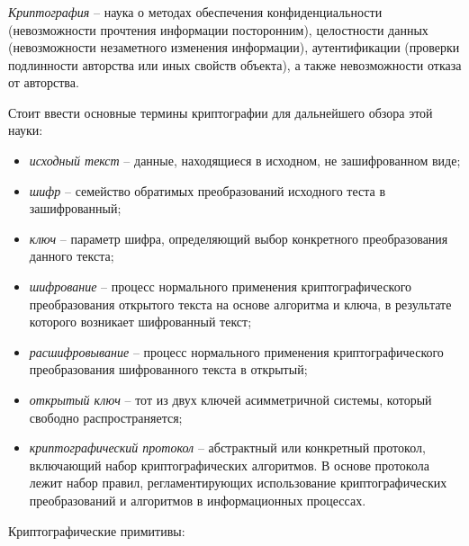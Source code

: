 \subsubsection{}
\label{sec:analysis:research:crypto:general}

\emph{Криптография} -- наука о методах обеспечения конфиденциальности (невозможности прочтения информации посторонним), целостности данных (невозможности незаметного изменения информации), аутентификации (проверки подлинности авторства или иных свойств объекта), а также невозможности отказа от авторства\cite{wiki:crypto}.

Стоит ввести основные термины криптографии для дальнейшего обзора этой науки:

\begin{itemize}
	\item \emph{исходный текст} -- данные, находящиеся в исходном, не зашифрованном виде;
	\item \emph{шифр} -- семейство обратимых преобразований исходного теста в зашифрованный;
	\item \emph{ключ} -- параметр шифра, определяющий выбор конкретного преобразования данного текста;
	\item \emph{шифрование} -- процесс нормального применения криптографического преобразования открытого текста на основе алгоритма и ключа, в результате которого возникает шифрованный текст;
	\item \emph{расшифровывание} -- процесс нормального применения криптографического преобразования шифрованного текста в открытый;
	\item \emph{открытый ключ} -- тот из двух ключей асимметричной системы, который свободно распространяется;
	\item \emph{криптографический протокол} -- абстрактный или конкретный протокол, включающий набор криптографических алгоритмов. В основе протокола лежит набор правил, регламентирующих использование криптографических преобразований и алгоритмов в информационных процессах.
\end{itemize}

Криптографические примитивы:

